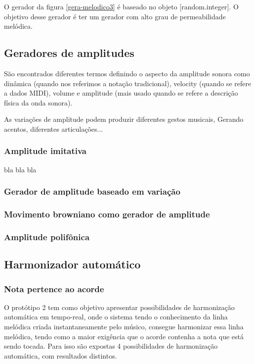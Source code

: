 \documentclass[draft]{ppgmus}
\begin{document}
O gerador da figura \ref{gera-melodico3} é baseado no 
objeto [random.integer]. O objetivo desse gerador é 
ter um gerador com alto grau de permeabilidade melódica.

\subsection{Geradores de amplitudes}

São encontrados diferentes termos definindo o aspecto
da amplitude sonora como dinâmica (quando nos referimos a notação tradicional),
velocity (quando se refere a dados MIDI), volume e amplitude (mais
usado quando se refere a descrição física da onda sonora).


As variações de amplitude podem produzir diferentes gestos musicais,
Gerando acentos, diferentes articulações...


\subsubsection{Amplitude imitativa}

bla bla bla

\subsubsection{Gerador de amplitude baseado em variação}

\subsubsection{Movimento browniano como gerador de amplitude}

\subsubsection{Amplitude polifônica}


\subsection{Harmonizador automático}

\subsubsection{Nota pertence ao acorde}


O protótipo 2 tem como objetivo apresentar possibilidades de harmonização automática em tempo-real,
onde o sistema tendo o conhecimento da linha melódica criada instantaneamente pelo músico, consegue
harmonizar essa linha melódica, tendo como a maior exigência que o acorde contenha a nota que está sendo
tocada. Para isso são expostas 4 possibilidades de harmonização automática, com resultados distintos.
\end{document}
